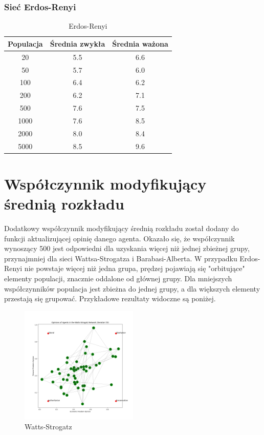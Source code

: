 \documentclass{wfiisul}
\begin{document}
\subsubsection{Sieć Erdos-Renyi}

\begin{table}[htbp]
  \centering
  \begin{tabular}{c|c|c}
    \hline
    Populacja & Średnia zwykła & Średnia ważona \\
    \hline
    20        & 5.5            & 6.6            \\
    50        & 5.7            & 6.0            \\
    100       & 6.4            & 6.2            \\
    200       & 6.2            & 7.1            \\
    500       & 7.6            & 7.5            \\
    1000      & 7.6            & 8.5            \\
    2000      & 8.0            & 8.4            \\
    5000      & 8.5            & 9.6            \\
  \end{tabular}
  \caption{Erdos-Renyi}
  \label{tab:erdos_renyi}
\end{table}


\section{Współczynnik modyfikujący średnią rozkładu}

Dodatkowy współczynnik modyfikujący średnią rozkładu został dodany do funkcji aktualizującej opinię danego agenta.
Okazało się, że współczynnik wynoszący 500 jest odpowiedni dla uzyskania więcej niż jednej zbieżnej grupy, przynajmniej dla sieci Wattsa-Strogatza i Barabasi-Alberta.
W przypadku Erdos-Renyi nie powstaje więcej niż jedna grupa, prędzej pojawiają się "orbitujące" elementy populacji, znacznie oddalone od głównej grupy.
Dla mniejszych współczynników populacja jest zbieżna do jednej grupy, a dla większych elementy przestają się grupować.
Przykładowe rezultaty widoczne są poniżej.

\begin{figure}
  \centering
  \includegraphics[width=0.5\textwidth]{img/Watts-Strogatz.png}
  \caption{Watts-Strogatz}
  \label{fig:Watts-Strogatz}
\end{figure}
\end{document}
